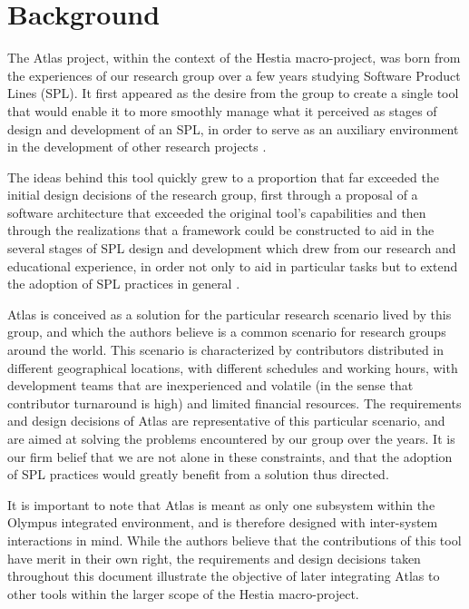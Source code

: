 \chapter{Background}
\label{chap:background}

The Atlas project, within the context of the Hestia macro-project, was born from the experiences of our research group over a few years studying Software Product Lines (SPL). It first appeared as the desire from the group to create a single tool that would enable it to more smoothly manage what it perceived as stages of design and development of an SPL, in order to serve as an auxiliary environment in the development of other research projects \cite{RODRIGUES:2014} \cite{RODRIGUES:2010}.

The ideas behind this tool quickly grew to a proportion that far exceeded the initial design decisions of the research group, first through a proposal of a software architecture that exceeded the original tool's capabilities \cite{LASER:2015} and then through the realizations that a framework could be constructed to aid in the several stages of SPL design and development which drew from our research and educational experience, in order not only to aid in particular tasks but to extend the adoption of SPL practices in general \cite{LASER:2015b} \cite{LASER:2016}.

Atlas is conceived as a solution for the particular research scenario lived by this group, and which the authors believe is a common scenario for research groups around the world. This scenario is characterized by contributors distributed in different geographical locations, with different schedules and working hours, with development teams that are inexperienced and volatile (in the sense that contributor turnaround is high) and limited financial resources. The requirements and design decisions of Atlas are representative of this particular scenario, and are aimed at solving the problems encountered by our group over the years. It is our firm belief that we are not alone in these constraints, and that the adoption of SPL practices would greatly benefit from a solution thus directed.

It is important to note that Atlas is meant as only one subsystem within the Olympus integrated environment, and is therefore designed with inter-system interactions in mind. While the authors believe that the contributions of this tool have merit in their own right, the requirements and design decisions taken throughout this document illustrate the objective of later integrating Atlas to other tools within the larger scope of the Hestia macro-project.


